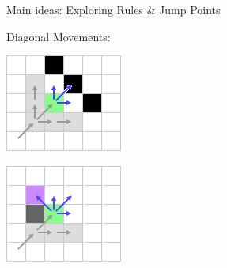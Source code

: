 \documentclass{presentation}
\begin{document}
\begin{frame}{Main ideas: Exploring Rules \& Jump Points}
		\begin{center}
		Diagonal Movements:\\
		\vspace{5mm}
		\begin{minipage}{0.3\textwidth}
			\includegraphics[width=\textwidth]{figures/extra_geschnitten/dm(obstacle).png}
		\end{minipage}%
		\hfill%
		\begin{minipage}{0.3\textwidth}
			\includegraphics[width=\textwidth]{figures/extra_geschnitten/dm(forced).png}

\end{minipage}
\end{center}
\end{frame}
\end{document}
